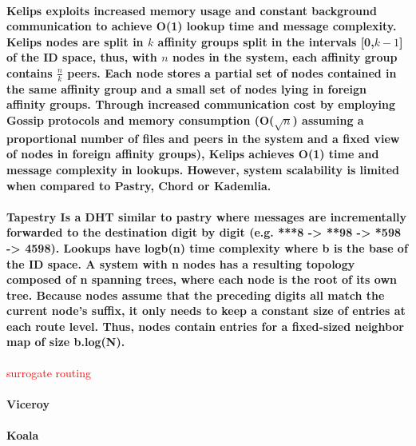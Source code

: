 \paragraph{ \textbf{Kelips} \cite{gupta2003kelips} exploits increased memory usage and constant background communication to achieve O(1) lookup time and message complexity. Kelips nodes are split in $k$ affinity groups split in the intervals [0,$k-1$] of the ID space, thus, with $n$ nodes in the system, each affinity group contains $\frac{n}{k}$ peers. Each node stores a partial set of nodes contained in the same affinity group and a small set of nodes lying in foreign affinity groups. Through increased communication cost by employing Gossip protocols and memory consumption (O($\sqrt{n}$) assuming a proportional number of files and peers in the system and a fixed view of nodes in foreign affinity groups), Kelips achieves O(1) time and message complexity in lookups. However, system scalability is limited when compared to Pastry, Chord or Kademlia. }

\paragraph{ \textbf{Tapestry} \cite{tapestry} Is a DHT similar to pastry where messages are incrementally forwarded to the destination digit by digit (e.g. ***8 -> **98 -> *598 -> 4598). Lookups have logb(n) time complexity where b is the base of the ID space. A system with n nodes has a resulting topology composed of n spanning trees, where each node is the root of its own tree. Because nodes assume that the preceding digits all match the current node's suffix, it only needs to keep a constant size of entries at each route level. Thus, nodes contain entries for a fixed-sized neighbor map of size b.log(N). }

\textcolor{red}{surrogate routing}

\paragraph{\textbf{Viceroy} }

\paragraph{\textbf{Koala} }



